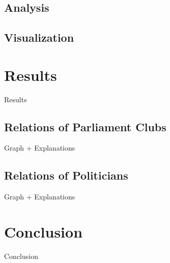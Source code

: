 \documentclass[12pt]{report}
\begin{document}
\section{Analysis}

\section{Visualization}

\chapter{Results}
Results

\section{Relations of Parliament Clubs}
Graph + Explanations

\section{Relations of Politicians}
Graph + Explanations

\chapter{Conclusion}
Conclusion

 

\end{document}
